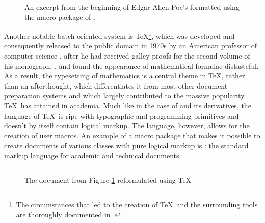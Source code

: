 \documentclass{book}
\begin{document}
\begin{figure}
  \inputminted{groff}{examples/02/poe.groff}
  \caption{An excerpt from the beginning of Edgar Allen Poe's  formatted using the 
   macro package of
  .}
  \label{fig:poe}
\end{figure}


Another notable batch-oriented system is \TeX{}\footnote{
  The circumstances that led to the creation of \TeX\ and the surrounding tools
  are thoroughly documented in \cite{knuth98}.
}, which was developed and consequently released to the public domain in 1970s
by an American professor of computer science , after he had
received galley proofs for the second volume of his monograph, , and found the appearance of mathematical formulae
distasteful.  As a result, the typesetting of mathematics is a central theme in
\TeX, rather than an afterthought, which differentiates it from most other
document preparation systems and which largely contributed to the massive
popularity \TeX\ has attained in academia. Much like in the case of
 and its derivatives, the language of \TeX\ is ripe with
typographic and programming primitives and doesn't by itself contain logical
markup. The language, however, allows for the creation of user macros. An
example of a macro package that makes it possible to create documents of various
classes with pure logical markup is \inx{\LaTeX}: the standard markup language
for academic and technical documents.

\begin{figure}
  \inputminted{tex}{examples/02/poe.tex}
  \caption{The  document from Figure \ref{fig:poe}
    reformulated using \TeX}
\end{figure}
\end{document}
